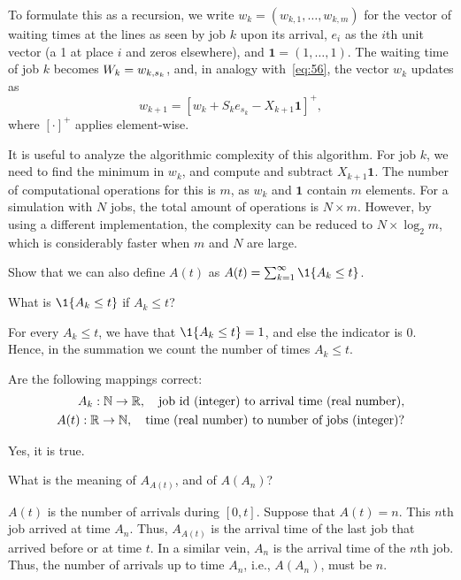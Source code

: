 To formulate this as a recursion, we write $w_k = (w_{k,1}, \ldots, w_{k,m})$ for the vector of waiting times at the lines as seen by job $k$ upon its arrival, $e_i$ as the $i$th unit vector (a 1 at place $i$ and zeros elsewhere), and $\mathbf{1} = (1,\ldots, 1)$.
The waiting time of job $k$ becomes $W_k = w_{k,s_k}$, and, in analogy with~\cref{eq:56}, the vector $w_k$ updates as
\begin{equation*}
  w_{k+1} = [w_k + S_k e_{s_k} - X_{k+1}\mathbf{1}]^+,
\end{equation*}
where $[\cdot]^+$ applies element-wise.

It is useful to analyze the algorithmic complexity of this algorithm.
For job $k$, we need to find the minimum in $w_k$, and compute and subtract $X_{k+1}\mathbf{1}$.
The number of computational operations for this is $m$, as $w_k$ and $\mathbf{1}$ contain $m$ elements.
For a simulation with $N$ jobs, the total amount of operations is $N \times m$.
However, by using a different implementation, the complexity can be reduced to $N\times \log_2{m}$, which is considerably faster when $m$ and $N$ are large.



\begin{exercise}\label{ex:20}
Show that we can also define $A(t)$ as $A(t) = \sum_{k=1}^\infty \1{A_k \leq t}$.
\begin{hint}
  What is $\1{A_k \leq t}$ if $A_k \leq t$?
\end{hint}
\begin{solution}
For every $A_k \leq t$, we have that $\1{A_k \leq t} = 1$, and else the indicator is $0$. Hence, in the summation we count the number of times $A_k \leq t$.
\end{solution}
\end{exercise}

\begin{exercise}\label{ex:60}
Are the following mappings correct:
\begin{align*}
 A_k : \mathbb{N} \to \mathbb{R}, \quad{\text{job id (integer) to arrival time (real number)}}, \\
 A(t) : \mathbb{R}\to \mathbb{N}, \quad{\text{time (real number) to number of jobs (integer)}}?
\end{align*}
\begin{solution}
  Yes, it is true.
\end{solution}
\end{exercise}

\begin{exercise}\label{ex:61}
 What is the meaning of $A_{A(t)}$, and of $A(A_n)$?
\begin{solution}
 $A(t)$ is the number of arrivals during $[0,t]$. Suppose that
 $A(t) = n$. This $n$th job arrived at time $A_n$. Thus, $A_{A(t)}$
 is the arrival time of the last job that arrived before or at time
 $t$. In a similar vein, $A_n$ is the arrival time of the $n$th
 job. Thus, the number of arrivals up to time $A_n$, i.e., $A(A_n)$,
 must be $n$.
\end{solution}
\end{exercise}

